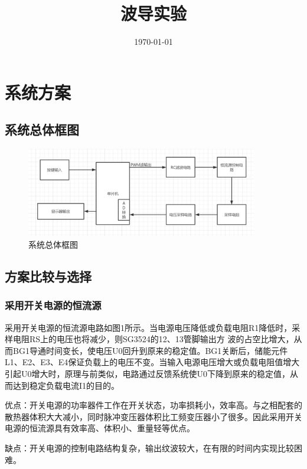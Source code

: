 \documentclass{../source/zjureport}
\title{波导实验}
\date{\today}
\begin{document}
    \makecover
    \makeheader

    \section{系统方案}
        \subsection{系统总体框图}

        \begin{figure}[thp]
            \centering
            \includegraphics[width = 0.9\textwidth]{figure/系统框图.png}
            \caption{系统总体框图}
        \end{figure}

        \subsection{方案比较与选择}
            \subsubsection{采用开关电源的恒流源}

            采用开关电源的恒流源电路如图1所示。当电源电压降低或负载电阻R1降低时，采样电阻RS上的电压也将减少，则SG3524的12、13管脚输出方 波的占空比增大，从而BG1导通时间变长，使电压U0回升到原来的稳定值。BG1关断后，储能元件L1、E2、E3、E4保证负载上的电压不变。当输入电源电压增大或负载电阻值增大引起U0增大时，原理与前类似，电路通过反馈系统使U0下降到原来的稳定值，从而达到稳定负载电流I1的目的。

            优点：开关电源的功率器件工作在开关状态，功率损耗小，效率高。与之相配套的散热器体积大大减小，同时脉冲变压器体积比工频变压器小了很多。因此采用开关电源的恒流源具有效率高、体积小、重量轻等优点。

            缺点：开关电源的控制电路结构复杂，输出纹波较大，在有限的时间内实现比较困难。
            \newpage
\end{document}
